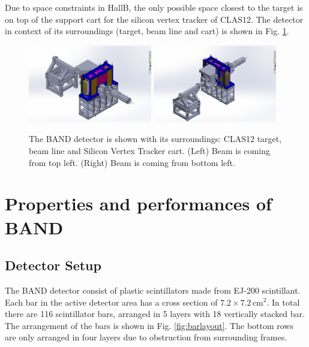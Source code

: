 \documentclass[review]{elsarticle}
\begin{document}
Due to space constraints in HallB, the only possible space closest to the target is on top of the support cart for the silicon vertex tracker of CLAS12.  The detector in context of its surroundings (target, beam line and cart) is shown in Fig. \ref{fig:bandcontext}.

\begin{figure}[thb]
\centering
\includegraphics[width=0.48\textwidth]{BandInContext1.png}
\includegraphics[width=0.48\textwidth]{BandInContext2.png}
 \caption{The BAND detector is shown with its surroundings: CLAS12 target, beam line and Silicon Vertex Tracker cart. (Left) Beam is coming from top left. (Right) Beam is coming from bottom left. }
  \label{fig:bandcontext}
\end{figure}


\section{Properties and performances of BAND}
\subsection{Detector Setup}
The BAND detector consist of plastic scintillators made from  EJ-200 scintillant. Each bar in the active detector area has a cross section of $7.2 \times 7.2\,\mathrm{cm}^{2}$. In total there are 116 scintillator bars, arranged in 5 layers with 18 vertically stacked bar. The arrangement of the bars is shown in Fig. \ref{fig:barlayout}. The bottom rows are only arranged in four layers due to obstruction from surrounding frames.
\end{document}
